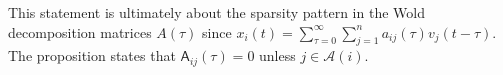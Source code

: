 \documentclass[12pt]{article}
\def\B{\mathsf{B}}  %
\def\wtB{\widetilde{\B}}  %
\def\A{\mathsf{A}}  %
\newcommand{\pa}[1]{pa(#1)}  %
\newcommand{\anc}[1]{\mathcal{A}(#1)}  %
\newcommand{\ancn}[2]{\mathcal{A}_{#1}(#2)}  %
\newcommand{\gpn}[2]{gp_{#1}(#2)}  %
\begin{document}
This statement is ultimately about the sparsity pattern in the Wold
decomposition matrices $A(\tau)$ since
$x_i(t) = \sum_{\tau = 0}^\infty \sum_{j = 1}^n a_{ij}(\tau)v_j(t -
\tau)$.  The proposition states that $\A_{ij}(\tau) = 0$ unless
$j \in \anc{i}$.






\end{document}
